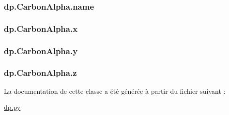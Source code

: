 \subsubsection[{\texorpdfstring{name}{name}}]{\setlength{\rightskip}{0pt plus 5cm}dp.\+Carbon\+Alpha.\+name}\hypertarget{classdp_1_1CarbonAlpha_a8ebe56e2818c231370b3f8ae8b4b76f9}{}\label{classdp_1_1CarbonAlpha_a8ebe56e2818c231370b3f8ae8b4b76f9}
\subsubsection[{\texorpdfstring{x}{x}}]{\setlength{\rightskip}{0pt plus 5cm}dp.\+Carbon\+Alpha.\+x}\hypertarget{classdp_1_1CarbonAlpha_a95a4d1d29a88ffe044ca571770fdb7c9}{}\label{classdp_1_1CarbonAlpha_a95a4d1d29a88ffe044ca571770fdb7c9}
\subsubsection[{\texorpdfstring{y}{y}}]{\setlength{\rightskip}{0pt plus 5cm}dp.\+Carbon\+Alpha.\+y}\hypertarget{classdp_1_1CarbonAlpha_ac196434c1abedb418ab1a7e90bda987c}{}\label{classdp_1_1CarbonAlpha_ac196434c1abedb418ab1a7e90bda987c}
\subsubsection[{\texorpdfstring{z}{z}}]{\setlength{\rightskip}{0pt plus 5cm}dp.\+Carbon\+Alpha.\+z}\hypertarget{classdp_1_1CarbonAlpha_a903ad8e7e02419f1537a2f59dbf62147}{}\label{classdp_1_1CarbonAlpha_a903ad8e7e02419f1537a2f59dbf62147}


La documentation de cette classe a été générée à partir du fichier suivant \+:\begin{DoxyCompactItemize}
\item 
\hyperlink{dp_8py}{dp.\+py}\end{DoxyCompactItemize}
